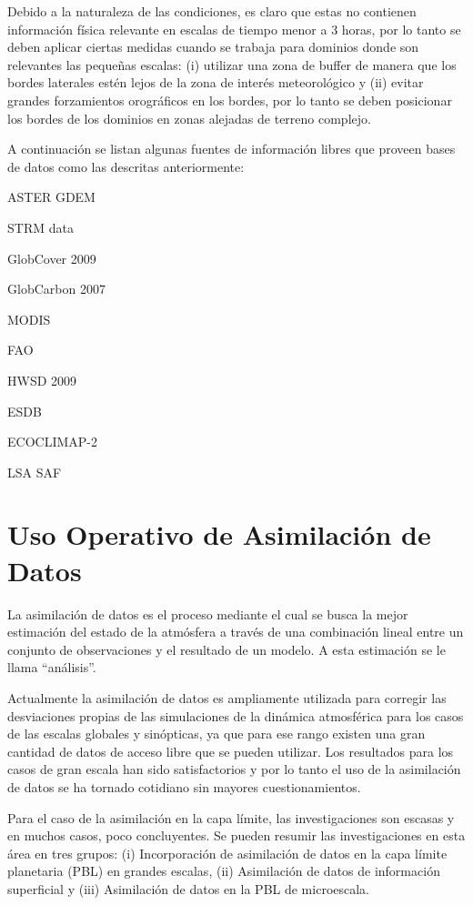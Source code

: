 Debido a la naturaleza de las condiciones, es claro que estas no contienen información física relevante en escalas de tiempo menor a 3 horas, por lo tanto se deben aplicar ciertas medidas cuando se trabaja para dominios donde son relevantes las pequeñas escalas: (i) utilizar una zona de buffer de manera que los bordes laterales estén lejos de la zona de interés meteorológico y (ii) evitar grandes forzamientos orográficos en los bordes, por lo tanto se deben posicionar los bordes de los dominios en zonas alejadas de terreno complejo. 

A continuación  se listan algunas fuentes de información libres que proveen bases de datos como las descritas anteriormente:
\begin{itemize*}
	\item ASTER GDEM
	\item STRM data
	\item GlobCover 2009
	\item GlobCarbon 2007
	\item MODIS
	\item FAO
	\item HWSD 2009
	\item ESDB
	\item ECOCLIMAP-2
	\item LSA SAF
\end{itemize*}
\newpage
\section{Uso Operativo de Asimilación de Datos}
La asimilación de datos es el proceso mediante el cual se busca la mejor  estimación del estado de la atmósfera a través de una combinación lineal entre un conjunto de observaciones y el resultado de un modelo. A esta estimación se le llama ``análisis''.

Actualmente la asimilación de datos es ampliamente utilizada para corregir las desviaciones propias de las simulaciones de la dinámica atmosférica para los casos de las escalas globales y sinópticas, ya que para ese rango existen una gran cantidad de datos de acceso libre que se pueden utilizar. Los resultados para los casos de gran escala han sido satisfactorios y por lo tanto el uso de la asimilación de datos se ha tornado cotidiano sin mayores cuestionamientos.

Para el caso de la asimilación en la capa límite, las investigaciones son escasas y en muchos casos, poco concluyentes. Se pueden resumir las investigaciones en esta área en tres grupos: (i) Incorporación de asimilación de datos en la capa límite planetaria (PBL) en grandes escalas, (ii) Asimilación de datos de información superficial y (iii) Asimilación de datos en la PBL de microescala. 

